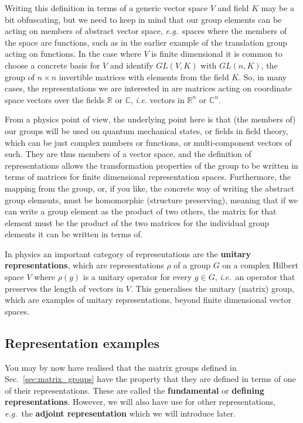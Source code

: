 \documentclass[notes.tex]{subfiles}
\begin{document}
Writing this definition in terms of a generic vector space $V$ and field $K$ may be a bit obfuscating, but we need to keep in mind that our group elements can be acting on members of abstract vector space, {\it e.g.}\ spaces where the members of the space are functions, such as in the earlier example of the translation group acting on functions. In the case where $V$ is finite dimensional it is common to choose a concrete basis for $V$ and identify $GL(V,K)$ with $GL(n, K)$, the group of $n\times n$ invertible matrices with elements from the field $K$. So, in many cases, the representations we are interested in are matrices acting on coordinate space vectors over the fields $\mathbb R$ or $\mathbb C$, {\it i.e.} vectors in $\mathbb R^n$ or $\mathbb C^n$.

From a physics point of view, the underlying point here is that (the members of) our groups will be used on quantum mechanical states, or fields in field theory, which can be just complex numbers or functions, or multi-component vectors of such. They are thus members of a vector space, and the definition of representations allows the transformation properties of the group to be written in terms of matrices for finite dimensional representation spaces. Furthermore, the mapping from the group, or, if you like, the concrete way of writing the abstract group elements, must be homomorphic (structure preserving), meaning that if we can write a group element as the product of two others, the matrix for that element must be the product of the two matrices for the individual group elements it can be written in terms of.

In physics an important category of representations are the {\bf unitary representations}, which are representations $\rho$ of a group $G$ on a complex Hilbert space $V$ where $\rho(g)$ is a unitary operator for every $g\in G$, {\it i.e.}\ an operator that preserves the length of vectors in $V$. This generalises the unitary (matrix) group, which are examples of unitary representations, beyond finite dimensional vector spaces.


\subsection{Representation examples}
You may by now have realised that the matrix groups defined in Sec.~\ref{sec:matrix_groups} have the property that they are defined in terms of one of their representations. These are called the {\bf fundamental} or {\bf defining  representations}. However, we will also have use for other representations, {\it e.g.}\ the {\bf adjoint representation} which we will introduce later.
\end{document}
